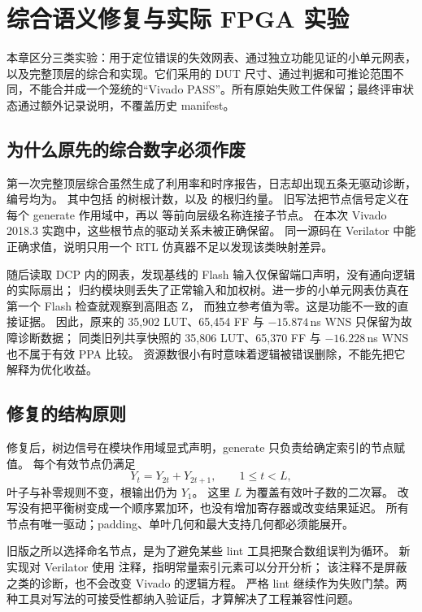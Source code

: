\chapter{综合语义修复与实际 FPGA 实验}
\label{ch:synthesis-repair}
本章区分三类实验：用于定位错误的失效网表、通过独立功能见证的小单元网表，以及完整顶层的综合和实现。它们采用的 DUT 尺寸、通过判据和可推论范围不同，不能合并成一个笼统的“Vivado PASS”。所有原始失败工件保留；最终评审状态通过额外记录说明，不覆盖历史 manifest。

\section{为什么原先的综合数字必须作废}
第一次完整顶层综合虽然生成了利用率和时序报告，日志却出现五条无驱动诊断，
编号均为。
其中包括  的树根计数，以及  的根归约量。
旧写法把节点信号定义在每个 generate 作用域中，再以
 等前向层级名称连接子节点。
在本次 Vivado 2018.3 实跑中，这些根节点的驱动关系未被正确保留。
同一源码在 Verilator 中能正确求值，说明只用一个 RTL 仿真器不足以发现该类映射差异。

随后读取 DCP 内的网表，发现基线的 Flash 输入仅保留端口声明，没有通向逻辑的实际扇出；
归约模块则丢失了正常输入和加权树。进一步的小单元网表仿真在第一个 Flash 检查就观察到高阻态 Z，
而独立参考值为零。这是功能不一致的直接证据。
因此，原来的 35,902 LUT、65,454 FF 与 $-15.874$\,ns WNS 只保留为故障诊断数据；
同类旧列共享快照的 35,806 LUT、65,370 FF 与 $-16.228$\,ns WNS 也不属于有效 PPA 比较。
资源数很小有时意味着逻辑被错误删除，不能先把它解释为优化收益。

\section{修复的结构原则}
修复后，树边信号在模块作用域显式声明，generate 只负责给确定索引的节点赋值。
每个有效节点仍满足
\begin{equation}
Y_t=Y_{2t}+Y_{2t+1},\qquad 1\le t<L,
\end{equation}
叶子与补零规则不变，根输出仍为 \(Y_1\)。
这里 \(L\) 为覆盖有效叶子数的二次幂。
改写没有把平衡树变成一个顺序累加环，也没有增加寄存器或改变结果延迟。
所有节点有唯一驱动；padding、单叶几何和最大支持几何都必须能展开。

旧版之所以选择命名节点，是为了避免某些 lint 工具把聚合数组误判为循环。
新实现对 Verilator 使用  注释，指明常量索引元素可以分开分析；
该注释不是屏蔽  之类的诊断，也不会改变 Vivado 的逻辑方程。
严格 lint 继续作为失败门禁。两种工具对写法的可接受性都纳入验证后，才算解决了工程兼容性问题。


